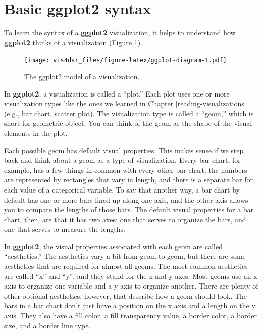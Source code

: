 \documentclass[
]{krantz}
\begin{document}
\hypertarget{basic-ggplot2-syntax}{%
\section{Basic ggplot2 syntax}\label{basic-ggplot2-syntax}}

To learn the syntax of a \textbf{ggplot2} visualization, it helps to understand how
\textbf{ggplot2} thinks of a visualization (Figure \ref{fig:ggplot-diagram}).

\begin{figure}
\centering
\texttt{[image: vis4dsr\_files/figure-latex/ggplot-diagram-1.pdf]}
\caption{\label{fig:ggplot-diagram}The ggplot2 model of a visualization.}
\end{figure}

In \textbf{ggplot2},
a visualization is called a ``plot.'' Each plot uses one or more visualization types
like the ones we learned in Chapter \ref{reading-visualizations} (e.g., bar
chart, scatter plot). The visualization type is called a ``geom,'' which is short
for geometric object. You can think of the geom as the shape of the visual elements
in the plot.

Each possible geom has default visual properties. This makes sense if we step back
and think about a geom as a type of visualization. Every bar chart, for example,
has a few things in common with every other bar chart: the numbers are represented
by rectangles that vary in length, and there is a separate bar for each value of
a categorical variable. To say that another way, a bar chart by default has one
or more bars lined up along one axis, and the other axis allows you to compare
the lengths of those bars. The default visual properties for a bar chart, then,
are that it has two axes: one that serves to organize the bars, and one that
serves to measure the lengths.

In \textbf{ggplot2}, the visual properties associated with each geom are called ``aesthetics.''
The aesthetics vary a bit from geom to geom, but there are some aesthetics that
are required for almost all geoms. The most common aesthetics are called ``x'' and ``y'',
and they stand for the x and y axes. Most geoms use an x axis to organize
one variable and a y axis to organize another. There are plenty of other optional
aesthetics, however, that describe how a geom should look. The bars
in a bar chart don't just have a position on the x axis and a length on the y axis.
They also have a fill color, a fill transparency value, a border color, a border
size, and a border line type.
\end{document}
